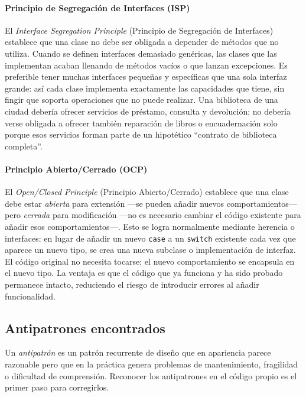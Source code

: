 \documentclass[11pt,a4paper]{article}
\newcommand{\code}[1]{\texttt{#1}}
\begin{document}
\label{sec:fund-isp}
\paragraph{Principio de Segregación de Interfaces (ISP)}

El \emph{Interface Segregation Principle} (Principio de Segregación de Interfaces)
establece que una clase no debe ser obligada a depender de métodos que no
utiliza.  Cuando se definen interfaces demasiado genéricas, las clases que las
implementan acaban llenando de métodos vacíos o que lanzan excepciones.  Es
preferible tener muchas interfaces pequeñas y específicas que una sola interfaz
grande: así cada clase implementa exactamente las capacidades que tiene, sin
fingir que soporta operaciones que no puede realizar.  Una biblioteca de una
ciudad debería ofrecer servicios de préstamo, consulta y devolución; no debería
verse obligada a ofrecer también reparación de libros o encuadernación solo
porque esos servicios forman parte de un hipotético ``contrato de biblioteca
completa''.

\label{sec:fund-ocp}
\paragraph{Principio Abierto/Cerrado (OCP)}

El \emph{Open/Closed Principle} (Principio Abierto/Cerrado) establece que una
clase debe estar \emph{abierta} para extensión ---se pueden añadir nuevos
comportamientos--- pero \emph{cerrada} para modificación ---no es necesario
cambiar el código existente para añadir esos comportamientos---.  Esto se logra
normalmente mediante herencia o interfaces: en lugar de añadir un nuevo
\code{case} a un \code{switch} existente cada vez que aparece un nuevo tipo,
se crea una nueva subclase o implementación de interfaz.  El código original
no necesita tocarse; el nuevo comportamiento se encapsula en el nuevo tipo.
La ventaja es que el código que ya funciona y ha sido probado permanece intacto,
reduciendo el riesgo de introducir errores al añadir funcionalidad.

\subsection{Antipatrones encontrados}
\label{sec:fund-antipatrones}

Un \emph{antipatrón} es un patrón recurrente de diseño que en apariencia
parece razonable pero que en la práctica genera problemas de mantenimiento,
fragilidad o dificultad de comprensión.  Reconocer los antipatrones en el
código propio es el primer paso para corregirlos.
\end{document}
